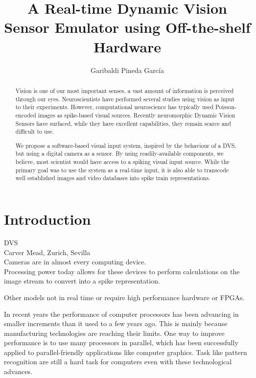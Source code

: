 \documentclass[]{article}
\title{A Real-time Dynamic Vision Sensor Emulator using Off-the-shelf Hardware}
\author{Garibaldi Pineda García}
\begin{document}
\maketitle

\begin{abstract}
Vision is one of our most important senses, a vast amount of information is perceived through our eyes. Neuroscientists have performed several studies using vision as input to their experiments. However, computational neuroscience has typically used Poisson-encoded images as spike-based visual sources. Recently neuromorphic Dynamic Vision Sensors have surfaced, while they have excellent capabilities, they remain scarce and difficult to use.

We propose a software-based visual input system, inspired by the behaviour of a DVS, but using a digital camera as a sensor. By using readily-available components, we believe, most scientist would have access to a spiking visual input source. While the primary goal was to use the system as a real-time input, it is also able to transcode well established images and video databases into spike train representations.

\end{abstract}

\section{Introduction}
DVS\\
Carver Mead, Zurich, Sevilla\\

Cameras are in almost every computing device.\\

Processing power today allows for these devices to perform calculations on the image stream to convert into a spike representation.

Other models not in real time or require high performance hardware or FPGAs.

\vspace*{1cm}
In recent years the performance of computer processors has been advancing in smaller increments than it used to a few years ago. This is mainly because manufacturing technologies are reaching their limits. One way to improve performance is to use many processors in parallel, which has been successfully applied to parallel-friendly applications like computer graphics. Task like pattern recognition are still a hard task for computers even with these technological advances.
\end{document}
